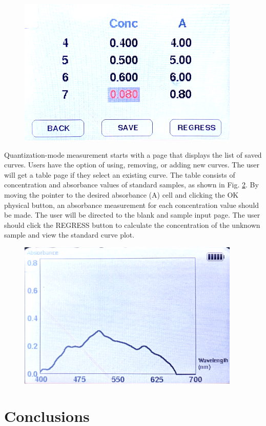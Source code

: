 \documentclass[conference]{IEEEtran}
\begin{document}
    \begin{figure}[htbp]
    \centerline{\includegraphics[scale=0.6]{lcd-spectrum.png}}
    \label{lcd-spectrum}
    \end{figure}

Quantization-mode measurement starts with a page that displays the list of saved curves.
Users have the option of using, removing, or adding new curves.
The user will get a table page if they select an existing curve.
The table consists of concentration and absorbance values of standard samples, as shown in Fig. \ref{lcd-table}.
By moving the pointer to the desired absorbance (A) cell and clicking the OK physical button, an absorbance measurement for each concentration value should be made.
The user will be directed to the blank and sample input page.
The user should click the REGRESS button to calculate the concentration of the unknown sample and view the standard curve plot.

    \begin{figure}[htbp]
    \centerline{\includegraphics[scale=0.6]{lcd-table.png}}
    \label{lcd-table}
    \end{figure}

\section{Conclusions}
\end{document}
